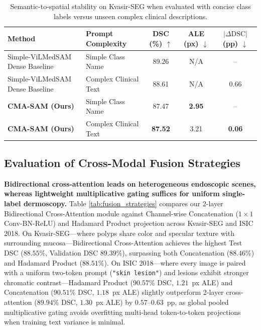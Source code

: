 \documentclass[onecolumn]{IEEEtran}
\numberwithin{equation}{section}
\theoremstyle{definition}
\theoremstyle{remark}
\begin{document}
\begin{table}[!htbp]
\centering
\caption{Semantic-to-spatial stability on Kvasir-SEG when evaluated with concise class labels versus unseen complex clinical descriptions.}
\label{tab:prompt_complexity}
\begin{tabularx}{\linewidth}{@{}Xlccc@{}}
\toprule
\textbf{Method} & \textbf{Prompt Complexity} & \textbf{DSC (\%)} $\uparrow$ & \textbf{ALE (px)} $\downarrow$ & \textbf{$|\Delta\text{DSC}|$ (pp)} $\downarrow$ \\
\midrule
Simple-ViLMedSAM Dense Baseline \cite{qian2024simplevilmedsam} & Simple Class Name & 89.26 & N/A & -- \\
Simple-ViLMedSAM Dense Baseline \cite{qian2024simplevilmedsam} & Complex Clinical Text & 88.61 & N/A & 0.66 \\
\midrule
\textbf{CMA-SAM (Ours)} & Simple Class Name & 87.47 & \textbf{2.95} & -- \\
\textbf{CMA-SAM (Ours)} & Complex Clinical Text & \textbf{87.52} & 3.21 & \textbf{0.06} \\
\bottomrule
\end{tabularx}
\end{table}

\subsection{Evaluation of Cross-Modal Fusion Strategies}

\textbf{Bidirectional cross-attention leads on heterogeneous endoscopic scenes, whereas lightweight multiplicative gating suffices for uniform single-label dermoscopy.} Table \ref{tab:fusion_strategies} compares our 2-layer Bidirectional Cross-Attention module against Channel-wise Concatenation ($1 \times 1$ Conv-BN-ReLU) and Hadamard Product projection \cite{lin2023multi} across Kvasir-SEG and ISIC 2018. On Kvasir-SEG—where polyps share color and specular texture with surrounding mucosa—Bidirectional Cross-Attention achieves the highest Test DSC ($88.55\%$, Validation DSC $89.39\%$), surpassing both Concatenation ($88.46\%$) and Hadamard Product ($88.51\%$). On ISIC 2018—where every image is paired with a uniform two-token prompt (\texttt{"skin lesion"}) and lesions exhibit stronger chromatic contrast—Hadamard Product ($90.57\%$ DSC, $1.21$~px ALE) and Concatenation ($90.51\%$ DSC, $1.18$~px ALE) slightly outperform 2-layer cross-attention ($89.94\%$ DSC, $1.30$~px ALE) by $0.57$--$0.63$~pp, as global pooled multiplicative gating avoids overfitting multi-head token-to-token projections when training text variance is minimal.
\end{document}
